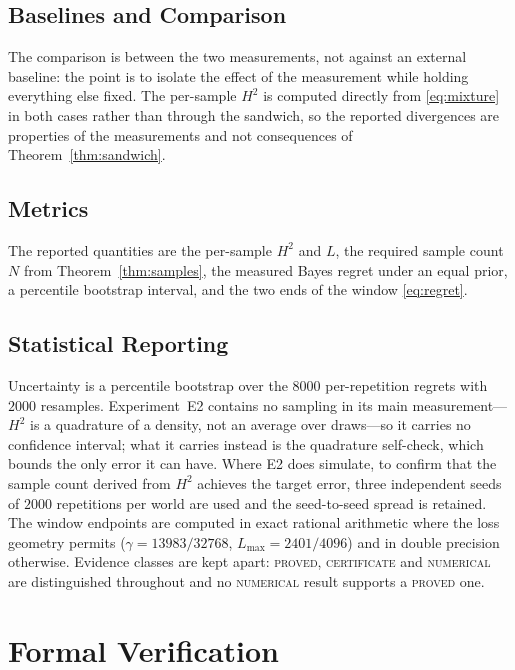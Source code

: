 \documentclass[conference]{IEEEtran}
\theoremstyle{definition}
\newcommand{\PROVED}{\textsc{proved}}
\newcommand{\CERT}{\textsc{certificate}}
\newcommand{\NUM}{\textsc{numerical}}
\begin{document}
\subsection{Baselines and Comparison}

The comparison is between the two measurements, not against an external baseline: the point
is to isolate the effect of the measurement while holding everything else fixed. The
per-sample $H^{2}$ is computed directly from \eqref{eq:mixture} in both cases rather than
through the sandwich, so the reported divergences are properties of the measurements and not
consequences of Theorem~\ref{thm:sandwich}.

\subsection{Metrics}

The reported quantities are the per-sample $H^{2}$ and $L$, the required sample count $N$
from Theorem~\ref{thm:samples}, the measured Bayes regret under an equal prior, a percentile
bootstrap interval, and the two ends of the window \eqref{eq:regret}.

\subsection{Statistical Reporting}

Uncertainty is a percentile bootstrap over the $8000$ per-repetition regrets with $2000$
resamples. Experiment~E2 contains no sampling in its main measurement---$H^{2}$ is a
quadrature of a density, not an average over draws---so it carries no confidence interval;
what it carries instead is the quadrature self-check, which bounds the only error it can have.
Where E2 does simulate, to confirm that the sample count derived from $H^{2}$ achieves the
target error, three independent seeds of $2000$ repetitions per world are used and the
seed-to-seed spread is retained. The window endpoints are computed in exact rational arithmetic where the loss
geometry permits ($\gamma=13983/32768$, $L_{\max}=2401/4096$) and in double precision
otherwise. Evidence classes are kept apart: \PROVED{}, \CERT{} and \NUM{} are distinguished
throughout and no \NUM{} result supports a \PROVED{} one.

\section{Formal Verification}
\label{sec:verification}
\end{document}
